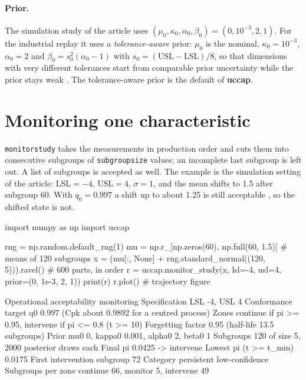 \documentclass[a4paper,11pt,oneside,openany,parskip=half-,headings=standardclasses,toc=flat,numbers=noenddot]{scrbook}
\newcommand{\code}[1]{\texttt{\begingroup\def\_{\textunderscore\allowbreak}#1\endgroup}}
\newcommand{\pkg}{\textsf{\bfseries uccap}}
\begin{document}
\paragraph{Prior.} The simulation study of the article uses $(\mu_0, \kappa_0, \alpha_0, \beta_0) = (0, 10^{-3}, 2, 1)$.
For the industrial replay it uses a \emph{tolerance-aware} prior: $\mu_0$ is the nominal, $\kappa_0 = 10^{-3}$,
$\alpha_0 = 2$ and $\beta_0 = s_0^2(\alpha_0 - 1)$ with $s_0 = (\mathrm{USL}-\mathrm{LSL})/8$, so that dimensions with
very different tolerances start from comparable prior uncertainty while the prior stays weak
\cite[Sec.~4.4]{jy-monitor}. The tolerance-aware prior is the default of \pkg{}.

\section{Monitoring one characteristic}

\code{monitor\_study} takes the measurements in production order and cuts them into consecutive subgroups of
\code{subgroup\_size} values; an incomplete last subgroup is left out. A list of subgroups is accepted as well.
The example is the simulation setting of the article: $\mathrm{LSL} = -4$, $\mathrm{USL} = 4$, $\sigma = 1$, and the
mean shifts to 1.5 after subgroup 60. With $q_0 = 0.997$ a shift up to about 1.25 is still acceptable
\cite[Sec.~5.4]{jy-monitor}, so the shifted state is not.

\begin{pycode}
import numpy as np
import uccap

rng = np.random.default_rng(1)
mu = np.r_[np.zeros(60), np.full(60, 1.5)]          # means of 120 subgroups
x = (mu[:, None] + rng.standard_normal((120, 5))).ravel()   # 600 parts, in order
r = uccap.monitor_study(x, lsl=-4, usl=4, prior=(0, 1e-3, 2, 1))
print(r)
r.plot()                                            # trajectory figure
\end{pycode}

\begin{outbox}[print(r)]
Operational acceptability monitoring
             Specification  LSL -4, USL 4
     Conformance target q0  0.997 (Cpk about 0.9892 for a centred process)
                     Zones  continue if pi >= 0.95, intervene if pi <= 0.8 (t >= 10)
         Forgetting factor  0.95 (half-life 13.5 subgroups)
                     Prior  mu0 0, kappa0 0.001, alpha0 2, beta0 1
                 Subgroups  120 of size 5, 2000 posterior draws each
                  Final pi  0.0425 -> intervene
    Lowest pi (t >= t_min)  0.0175
        First intervention  subgroup 72
                  Category  persistent low-confidence
        Subgroups per zone  continue 66, monitor 5, intervene 49
\end{outbox}
\end{document}
